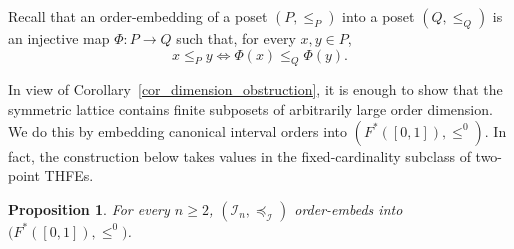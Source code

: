 \documentclass[11pt,a4paper]{article}
\newtheorem{proposition}[theorem]{Proposition}
\begin{document}
\smallskip

Recall that an order-embedding of a poset \((P,\le_P)\) into a poset \((Q,\le_Q)\) is an injective map \(\Phi:P\to Q\) such that, for every \(x,y\in P\),
\[
x\le_P y
\Longleftrightarrow
\Phi(x)\le_Q\Phi(y).
\]

In view of Corollary~\ref{cor_dimension_obstruction}, it is enough to show that the symmetric lattice contains finite subposets of arbitrarily large order dimension. We do this by embedding canonical interval orders into \((F^*([0,1]),\leq^0)\). In fact, the construction below takes values in the fixed-cardinality subclass of two-point THFEs.

\begin{proposition}\label{prop_interval_embedding_final}
For every \(n\ge 2\), \((\mathcal I_n,\preceq_{\mathcal I})\) order-embeds into \(\bigl(F^*([0,1]),\leq^0\bigr)\).
\end{proposition}
\end{document}
